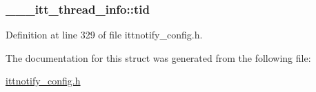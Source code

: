 \hypertarget{struct______itt__thread__info_adfe992c44e507418c56b509c9c985393}{
\subsubsection[{tid}]{ \-\_\-\-\_\-\-\_\-itt\-\_\-thread\-\_\-info\-::tid}}\label{struct______itt__thread__info_adfe992c44e507418c56b509c9c985393}


Definition at line 329 of file ittnotify\-\_\-config.\-h.



The documentation for this struct was generated from the following file\-:\begin{DoxyCompactItemize}
\item 
\hyperlink{ittnotify__config_8h}{ittnotify\-\_\-config.\-h}\end{DoxyCompactItemize}
